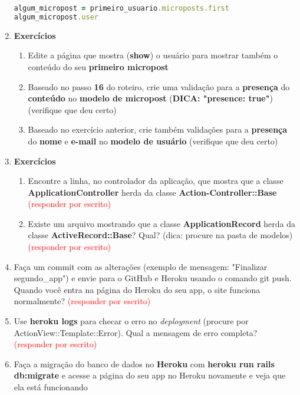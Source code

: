 \documentclass[a4paper,12pt]{article}
\begin{document}
\begin{enumerate}
  \begin{lstlisting}[language=Ruby]
algum_micropost = primeiro_usuario.microposts.first
algum_micropost.user
  \end{lstlisting}

  \item \textbf{Exercícios}

    \begin{enumerate}
      \item Edite a página que mostra (\textbf{show}) o usuário para mostrar também o conteúdo do seu \textbf{primeiro micropost}
      \item Baseado no passo \textbf{16} do roteiro, crie uma validação para a \textbf{presença} do \textbf{conteúdo} no \textbf{modelo de micropost} (\textbf{DICA: "presence: true"}) (verifique que deu certo)
      \item Baseado no exercício anterior, crie também validações para a \textbf{presença} do \textbf{nome} e \textbf{e-mail} no \textbf{modelo de usuário} (verifique que deu certo)
    \end{enumerate}

  \item \textbf{Exercícios}

    \begin{enumerate}
      \item Encontre a linha, no controlador da aplicação, que mostra que a classe \textbf{ApplicationController} herda da classe \textbf{Action-Controller::Base} \textcolor{red}{(responder por escrito)}
      \item Existe um arquivo mostrando que a classe \textbf{ApplicationRecord} herda da classe \textbf{ActiveRecord::Base}? Qual? (dica: procure na pasta de modelos) \textcolor{red}{(responder por escrito)}
    \end{enumerate}

  \item Faça um commit com as alterações (exemplo de mensagem: "Finalizar segundo\_app") e envie para o GitHub e Heroku usando o comando git push. Quando você entra na página do Heroku do seu app, o site funciona normalmente? \textcolor{red}{(responder por escrito)}

  \item Use \textbf{heroku logs} para checar o erro no \textit{deployment} (procure por ActionView::Template::Error). Qual a mensagem de erro completa? \textcolor{red}{(responder por escrito)}

  \item Faça a migração do banco de dados no \textbf{Heroku} com \textbf{heroku run rails db:migrate} e acesse a página do seu app no Heroku novamente e veja que ela está funcionando
\end{enumerate}
\end{document}
